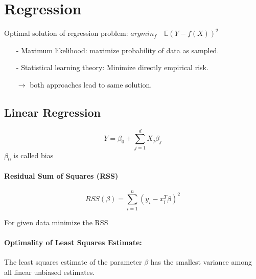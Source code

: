 \section{Regression}
Optimal solution of regression problem: $argmin_f \quad \mathbb{E}(Y - f(X))^2$\\
{\par }


\begin{itemize}
    \item[-]Maximum likelihood: maximize probability of data as sampled.
    \item[-]Statistical learning theory: Minimize directly empirical risk.
    \item[$\rightarrow$] both approaches lead to same solution.
\end{itemize}{}

\subsection{Linear Regression}
\begin{equation}
    Y = \beta_0 + \sum^d_{j=1}X_j\beta_j 
\end{equation}{} 
$\beta_0$ is called bias

\paragraph{Residual Sum of Squares (RSS)}
\begin{equation}
  RSS(\beta) = \sum^n_{i=1}(y_i - x_i^T \beta)^2
\end{equation}{}
{ \centering For given data minimize the RSS \par }

\paragraph{Optimality of Least Squares Estimate: }
The least squares estimate of the parameter $\beta$ has the smallest variance among all linear unbiased estimates.

